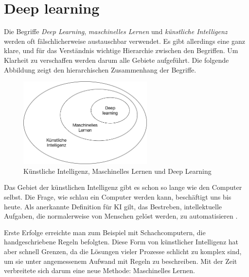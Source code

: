 \section{Deep learning}
Die Begriffe \textit{Deep Learning}, \textit{maschinelles Lernen} und \textit{künstliche Intelligenz} werden oft fälschlicherweise austauschbar verwendet. Es gibt allerdings eine ganz klare, und für das Verständnis wichtige Hierarchie zwischen den Begriffen. Um Klarheit zu verschaffen werden darum alle Gebiete aufgeführt. Die folgende Abbildung zeigt den hierarchischen Zusammenhang der Begriffe.

\begin{figure}[hbt]
	\centering
		\includegraphics[width=0.6\textwidth]{assets/hierarchy.png}
	\caption{Künstliche Intelligenz, Maschinelles Lernen und Deep Learning}
	\label{img:hierarchy}
\end{figure}

Das Gebiet der künstlichen Intelligenz gibt es schon so lange wie den Computer selbst. Die Frage, wie schlau ein Computer werden kann, beschäftigt uns bis heute. Als anerkannte Definition für KI gilt, das Bestreben, intellektuelle Aufgaben, die normalerweise von Menschen gelöst werden, zu automatisieren \parencite[][Kap. 1.1.1]{chollet}.

Erste Erfolge erreichte man zum Beispiel mit Schachcomputern, die handgeschriebene Regeln befolgten. Diese Form von künstlicher Intelligenz hat aber schnell Grenzen, da die Lösungen vieler Prozesse schlicht zu komplex sind, um sie unter angemessenem Aufwand mit Regeln zu beschreiben. Mit der Zeit verbreitete sich darum eine neue Methode: Maschinelles Lernen. \parencite[vgl. ][Kap. 1.1.1]{chollet}

